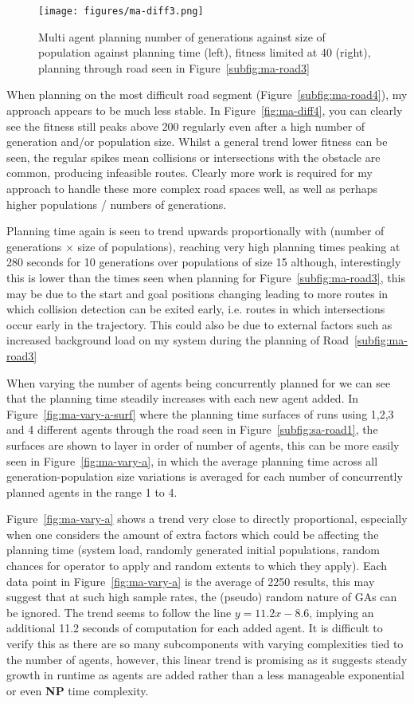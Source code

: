 \begin{figure}[ht]
  \centering
  \texttt{[image: figures/ma-diff3.png]}
  \caption{\label{fig:ma-diff3-lim40} Multi agent planning number of generations against size of population against planning time (left), fitness limited at 40 (right), planning through road seen in Figure~\ref{subfig:ma-road3}}
\end{figure}


When planning on the most difficult road segment (Figure~\ref{subfig:ma-road4}), my approach appears to be much less stable. In Figure~\ref{fig:ma-diff4}, you can clearly see the fitness still peaks above 200 regularly even after a high number of generation and/or population size. Whilst a general trend lower fitness can be seen, the regular spikes mean collisions or intersections with the obstacle are common, producing infeasible routes. Clearly more work is required for my approach to handle these more complex road spaces well, as well as perhaps higher populations / numbers of generations.

Planning time again is seen to trend upwards proportionally with (number of generations $\times$ size of populations), reaching very high planning times peaking at 280 seconds for 10 generations over populations of size 15 although, interestingly this is lower than the times seen when planning for Figure~\ref{subfig:ma-road3}, this may be due to the start and goal positions changing leading to more routes in which collision detection can be exited early, i.e. routes in which intersections occur early in the trajectory. This could also be due to external factors such as increased background load on my system during the planning of Road~\ref{subfig:ma-road3}

When varying the number of agents being concurrently planned for we can see that the planning time steadily increases with each new agent added. In Figure~\ref{fig:ma-vary-a-surf} where the planning time surfaces of runs using 1,2,3 and 4 different agents through the road seen in Figure~\ref{subfig:sa-road1}, the surfaces are shown to layer in order of number of agents, this can be more easily seen in Figure~\ref{fig:ma-vary-a}, in which the average planning time across all generation-population size variations is averaged for each number of concurrently planned agents in the range 1 to 4.

Figure~\ref{fig:ma-vary-a} shows a trend very close to directly proportional, especially when one considers the amount of extra factors which could be affecting the planning time (system load, randomly generated initial populations, random chances for operator to apply and random extents to which they apply). Each data point in Figure~\ref{fig:ma-vary-a} is the average of 2250 results, this may suggest that at such high sample rates, the (pseudo) random nature of GAs can be ignored. The trend seems to follow the line $y = 11.2x - 8.6$, implying an additional 11.2 seconds of computation for each added agent. It is difficult to verify this as there are so many subcomponents with varying complexities tied to the number of agents, however, this linear trend is promising as it suggests steady growth in runtime as agents are added rather than a less manageable exponential or even \textbf{NP} time complexity.

